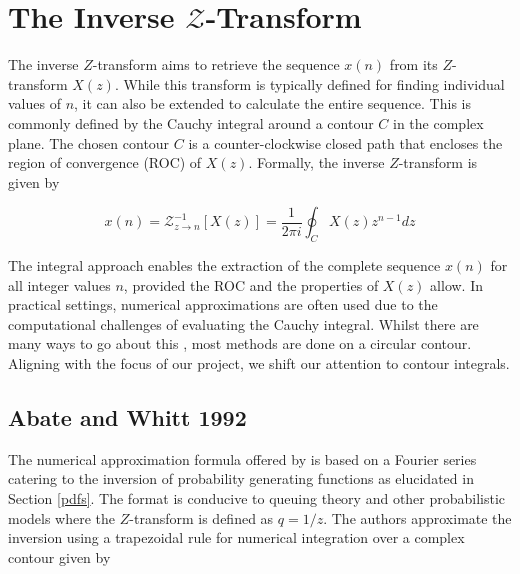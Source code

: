 \documentclass[a4paper]{report}
\begin{document}
\section{The Inverse \texorpdfstring{$\mathcal{Z}$}{Lg}-Transform}

The inverse $Z$-transform aims to retrieve the sequence $x(n)$ from its $Z$-transform $X(z)$. While this transform is typically defined for finding individual values of $n$, it can also be extended to calculate the entire sequence. This is commonly defined by the Cauchy integral around a contour $C$ in the complex plane. The chosen contour $C$ is a counter-clockwise closed path that encloses the region of convergence (ROC) of $X(z)$. Formally, the inverse $Z$-transform is given by

\begin{equation}\label{inverse_z-transform}
	x(n) = \mathcal{Z}^{-1}_{z \rightarrow n}[X(z)] = \frac{1}{2\pi i} \oint_C X(z)z^{n-1}dz
\end{equation}

The integral approach enables the extraction of the complete sequence $x(n)$ for all integer values $n$, provided the ROC and the properties of $X(z)$ allow. In practical settings, numerical approximations are often used due to the computational challenges of evaluating the Cauchy integral. Whilst there are many ways to go about this \citep{merrikh2014linearsys, rajkovic2004method, horvath2020numerical}, most methods are done on a circular contour. Aligning with the focus of our project, we shift our attention to contour integrals.


\subsection{Abate and Whitt 1992}\label{abate_whitt_section}
The numerical approximation formula offered by \citet{AbateWhitt1992a, AbateWhitt1992b} is based on a Fourier series catering to the inversion of probability generating functions as elucidated in Section \ref{pdfs}. The format is conducive to queuing theory and other probabilistic models where the $Z$-transform is defined as $q = 1 / z$. The authors approximate the inversion using a trapezoidal rule for numerical integration over a complex contour given by
\end{document}
